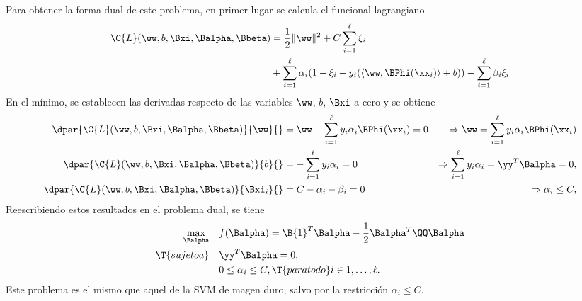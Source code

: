 



Para obtener la forma dual de este problema, en primer lugar se
calcula el funcional lagrangiano
%
\begin{align}
  \begin{split}
  \C{L}(\ww,b,\Bxi,\Balpha,\Bbeta) &= \frac{1}{2} \|\ww\|^2 + C \sum_{i=1}^{\ell} \xi_i \\
  &+ \sum_{i=1}^{\ell} \alpha_i (1-\xi_i-y_i(\langle\ww,\BPhi(\xx_i)\rangle+b)) - \sum_{i=1}^{\ell} \beta_i\xi_i
  \end{split}
\end{align}
%
En el mínimo, se establecen las derivadas respecto de las variables
$\ww$, $b$, $\Bxi$ a cero y se obtiene
%
\begin{align}
  \dpar{ \C{L}(\ww,b,\Bxi,\Balpha,\Bbeta)}{\ww}{}
    &=\ww-\sum_{i=1}^\ell y_i\alpha_i\BPhi(\xx_i) = 0
    &\Rightarrow \ww = \sum_{i=1}^\ell y_i\alpha_i\BPhi(\xx_i)
  \\
  \dpar{ \C{L}(\ww,b,\Bxi,\Balpha,\Bbeta)}{b}{}
    &=-\sum_{i=1}^\ell y_i\alpha_i = 0
    &\Rightarrow \sum_{i=1}^\ell y_i\alpha_i = \yy^T\Balpha = 0,\\
  \dpar{ \C{L}(\ww,b,\Bxi,\Balpha,\Bbeta)}{\Bxi_i}{}
    &=C-\alpha_i-\beta_i = 0
    &\Rightarrow \alpha_i \leq C,
\end{align}
%
Reescribiendo estos resultados en el problema dual, se tiene
%
\begin{align}
\begin{split}\label{svmprob-dual-soft}
    \max_{\Balpha} \quad
    & f(\Balpha) = \B{1}^T\Balpha-\frac{1}{2}\Balpha^T\QQ\Balpha\\
    \T{sujeto a}\quad & \yy^T\Balpha = 0, \\
                      & 0\leq\alpha_i\leq C, \T{ para todo } i\in {1,\ldots,\ell }.
\end{split}\end{align}
%
Este problema es el mismo que aquel de la SVM de magen duro, salvo por la restricción
$\alpha_i\leq C$.

